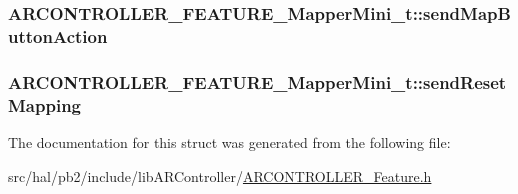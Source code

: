 \subsubsection[{\texorpdfstring{send\+Map\+Button\+Action}{sendMapButtonAction}}]{ A\+R\+C\+O\+N\+T\+R\+O\+L\+L\+E\+R\+\_\+\+F\+E\+A\+T\+U\+R\+E\+\_\+\+Mapper\+Mini\+\_\+t\+::send\+Map\+Button\+Action}\hypertarget{struct_a_r_c_o_n_t_r_o_l_l_e_r___f_e_a_t_u_r_e___mapper_mini__t_a12242574404227daaae4707c5dc3fa31}{}\label{struct_a_r_c_o_n_t_r_o_l_l_e_r___f_e_a_t_u_r_e___mapper_mini__t_a12242574404227daaae4707c5dc3fa31}
\subsubsection[{\texorpdfstring{send\+Reset\+Mapping}{sendResetMapping}}]{ A\+R\+C\+O\+N\+T\+R\+O\+L\+L\+E\+R\+\_\+\+F\+E\+A\+T\+U\+R\+E\+\_\+\+Mapper\+Mini\+\_\+t\+::send\+Reset\+Mapping}\hypertarget{struct_a_r_c_o_n_t_r_o_l_l_e_r___f_e_a_t_u_r_e___mapper_mini__t_a5116e2ddafe64dc0f5965fd5ce7e0979}{}\label{struct_a_r_c_o_n_t_r_o_l_l_e_r___f_e_a_t_u_r_e___mapper_mini__t_a5116e2ddafe64dc0f5965fd5ce7e0979}


The documentation for this struct was generated from the following file\+:\begin{DoxyCompactItemize}
\item 
src/hal/pb2/include/lib\+A\+R\+Controller/\hyperlink{_a_r_c_o_n_t_r_o_l_l_e_r___feature_8h}{A\+R\+C\+O\+N\+T\+R\+O\+L\+L\+E\+R\+\_\+\+Feature.\+h}\end{DoxyCompactItemize}
